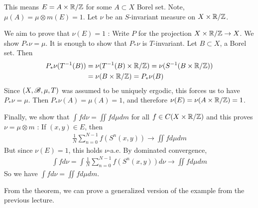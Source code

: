 \documentclass[10pt,a4paper]{report}
\newenvironment{proof}
{\begin{changemargin}{1cm}{0.5cm} 
	}%
	{\end{changemargin}
}
\begin{document}
\begin{proof}
This means $E = A\times \mathbb{R}/ \mathbb{Z}$ for some $A\subset X$ Borel set. Note, $\mu(A) = \mu \otimes m(E) =1$. Let $\nu$ be an $S$-invariant measure on $X\times \mathbb{R}/\mathbb{Z}$.

\quad We aim to prove that $\nu(E) =1$ : Write $P$ for the projection $X\times \mathbb{R}/ \mathbb{Z} \rightarrow X$. We show $P_* \nu = \mu$. It is enough to show that $P_* \nu$ is $T$-invariant. Let $B\subset X$, a Borel set. Then
\begin{align*}
P_* \nu(T^{-1}(B)) &= \nu(T^{-1} (B) \times \mathbb{R}/\mathbb{Z}) = \nu (S^{-1}(B\times \mathbb{R}/ \mathbb{Z}))\\
&= \nu(B\times \mathbb{R}/\mathbb{Z}) = P_* \nu(B)
\end{align*}
Since $(X,\mathscr{B},\mu,T)$ was assumed to be uniquely ergodic, this forces us to have $P_* \nu =\mu$. Then $P_*\nu(A) = \mu(A) =1$, and therefore $\nu(E) = \nu(A\times \mathbb{R}/ \mathbb{Z})=1$.

\quad Finally, we show that $\int f d\nu = \iint f d\mu dm$ for all $f\in C(X\times \mathbb{R}/ \mathbb{Z})$ and this proves $\nu = \mu \otimes m$ : If $(x,y) \in E$, then
\begin{align*}
\frac{1}{N} \sum_{n=0}^{N-1} f(S^n (x,y)) \rightarrow \iint f d\mu dm
\end{align*}
But since $\nu(E) = 1$, this holds $\nu$-a.e. By dominated convergence,
\begin{align*}
\int f d\nu = \int \frac{1}{N} \sum_{n=0}^{N-1} f(S^n(x,y)) d\nu \rightarrow \iint fd\mu dm
\end{align*}
So we have $\int fd\nu = \iint fd\mu dm$.

\eop
\end{proof}
\s

From the theorem, we can prove a generalized version of the example from the previous lecture.
\s
\end{document}
